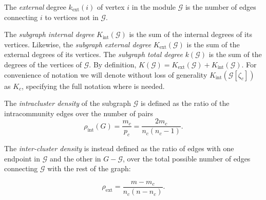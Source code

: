 The \emph{external} degree $k_{\textrm{ext}}(i)$ of vertex $i$ in the module $\mathcal{G}$ is the number of edges connecting $i$ to vertices not in $\mathcal{G}$.

The \emph{subgraph internal degree} $K_{\textrm{int}}(\mathcal{G})$ is the sum of the internal degrees of its vertices.
Likewise, the \emph{subgraph external degree} $K_{\textrm{ext}}(\mathcal{G})$ is the sum of the external degrees of its vertices.
The \emph{subgraph total degree} $k(\mathcal{G})$ is the sum of the degrees of the vertices of $\mathcal{G}$. By definition, $K(\mathcal{G}) = K_{\textrm{ext}}(\mathcal{G}) + K_{\textrm{int}}(\mathcal{G})$. For convenience of notation we will denote without loss of generality $K_{\textrm{int}}(\mathcal{G}[ \zeta_c ])$ as $K_c$, specifying the full notation where is needed.


The \emph{intracluster density} of the subgraph $\mathcal{G}$ is defined as the ratio of the intracommunity edges over the number of pairs 
\begin{equation}
\rho_{\textrm{int}}(G)=\frac{m_c}{p_c} = \frac{2 m_c}{n_c(n_c-1)}.
\end{equation}

The \emph{inter-cluster density} is instead defined as the ratio of edges with one endpoint in $\mathcal{G}$ and the other in $G-\mathcal{G}$, over the total possible number of edges connecting $\mathcal{G}$ with the rest of the graph: 

\begin{equation}
\rho_{\textrm{ext}}=\frac{m-m_c}{n_c(n-n_c)}.
\end{equation}

